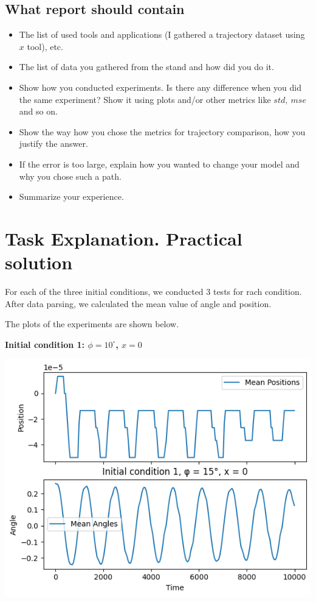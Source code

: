 \documentclass{article}
\begin{document}
\subsection{What report should contain}
\begin{itemize}
\item The list of used tools and applications (I gathered a trajectory dataset using $x$ tool), etc.
\item The list of data you gathered from the stand and how did you do it.
\item Show how you conducted experiments. Is there any difference when you did the same experiment? Show it using plots and/or other metrics like $std,\ mse$ and so on.
\item Show the way how you chose the metrics for trajectory comparison, how you justify the answer.
\item If the error is too large, explain how you wanted to change your model and why you chose such a path.
\item Summarize your experience.
\end{itemize}

\section{Task Explanation. Practical solution}

For each of the three initial conditions, we conducted 3 tests for rach condition. 
After data parsing, we calculated the mean value of angle and position. 

The plots of the experiments are shown below.

\textbf{Initial condition 1: $\phi = 10^\circ$, $x = 0$}

\includegraphics*[scale=0.5]{graphics/init_1.png}
\end{document}
